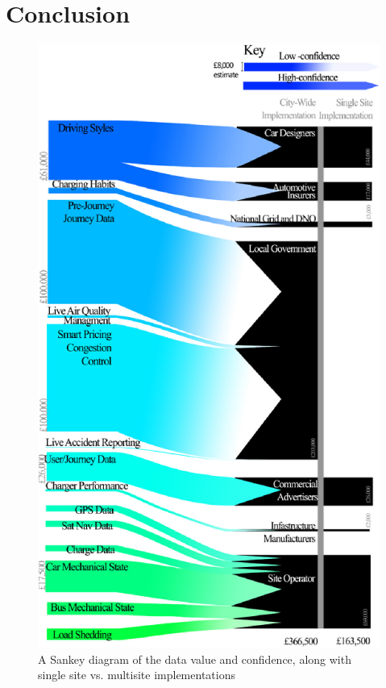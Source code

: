 \documentclass[conference]{IEEEtran}
\begin{document}
\section{Conclusion} 

\begin{figure}[!htp]
\centering
\includegraphics[width=\columnwidth]{images/sankey.png}
\caption{A Sankey diagram of the data value and confidence, along with
  single site vs. multisite implementations}
\label{fig:sankey}
\end{figure}






\end{document}
